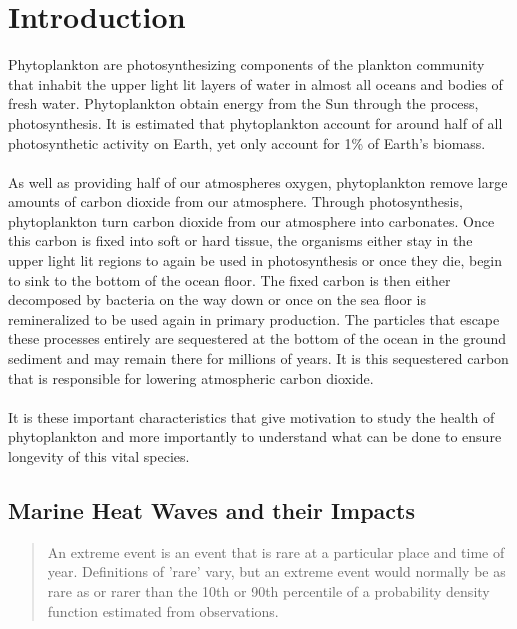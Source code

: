 \chapter{Introduction} %

Phytoplankton are photosynthesizing components of the plankton community that inhabit the upper light lit layers of water in almost all oceans and bodies of fresh water. Phytoplankton obtain energy from the Sun through the process, photosynthesis. It is estimated that phytoplankton account for around half of all photosynthetic activity on Earth, \cite{halfO2} yet only account for 1\% of Earth's biomass. \cite{bidle2004cell} 
\\\\
As well as providing half of our atmospheres oxygen, phytoplankton remove large amounts of carbon dioxide from our atmosphere. Through photosynthesis, phytoplankton turn carbon dioxide from our atmosphere into carbonates. Once this carbon is fixed into soft or hard tissue, the organisms either stay in the upper light lit regions to again be used in photosynthesis or once they die, begin to sink to the bottom of the ocean floor. The fixed carbon is then either decomposed by bacteria on the way down or once on the sea floor is remineralized to be used again in primary production. The particles that escape these processes entirely are sequestered at the bottom of the ocean in the ground sediment and may remain there for millions of years. It is this sequestered carbon that is responsible for lowering atmospheric carbon dioxide.
\\\\
It is these important characteristics that give motivation to study the health of phytoplankton and more importantly to understand what can be done to ensure longevity of this vital species. 

\section{Marine Heat Waves and their Impacts}

\begin{quote}
    An extreme event is an event that is rare at a particular place and time of year. Definitions of 'rare' vary, but an extreme event would normally be as rare as or rarer than the 10th or 90th percentile of a probability density function estimated from observations. \hfill\cite[p.~6-8]{IPCC2019}
\end{quote}

